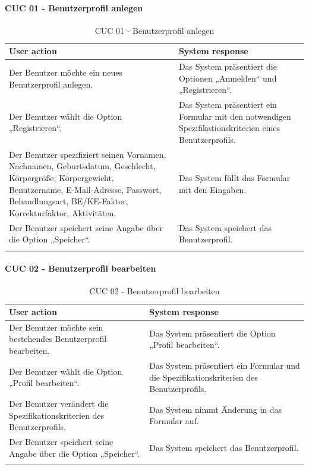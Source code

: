 \paragraph{CUC 01 - Benutzerprofil anlegen}
  \begin{center}
 	\begin{longtable}[H]{|p{6cm}|p{6cm}|}
 		\hline
 		\textbf{User action} & \textbf{System response}\\
 		\hline
 		Der Benutzer möchte ein neues Benutzerprofil anlegen.& Das System präsentiert die Optionen „Anmelden“ und „Registrieren“.\\
 		\hline
 		Der Benutzer wählt die Option „Registrieren“. &  Das System präsentiert ein Formular mit den notwendigen Spezifikationskriterien eines Benutzerprofils.\\
 		\hline
 		Der Benutzer spezifiziert seinen Vornamen, Nachnamen, Geburtsdatum, Geschlecht, Körpergröße, Körpergewicht, Benutzername, 
 		E-Mail-Adresse, Passwort, Behandlungsart, BE/KE-Faktor, Korrekturfaktor, Aktivitäten. & Das System 	füllt das Formular mit den Eingaben.\\
 		\hline
 		Der Benutzer speichert seine Angabe über die Option „Speicher“. & Das System speichert das Benutzerprofil.\\
 		\hline
 		\captionsetup{justification=centering}
 		\caption{CUC 01 - Benutzerprofil anlegen}
 		\label{tab:Persona Use Cases 1}
 	\end{longtable}
 \end{center}
\paragraph{CUC 02 - Benutzerprofil bearbeiten}
\begin{center}
	\begin{longtable}[H]{|p{6cm}|p{6cm}|}
		\hline
		\textbf{User action} & \textbf{System response}\\
		\hline
		Der Benutzer möchte sein bestehendes Benutzerprofil bearbeiten. & Das System präsentiert die Option „Profil bearbeiten“.\\
		\hline
		Der Benutzer wählt die Option „Profil bearbeiten“. &  Das System präsentiert ein Formular und die Spezifikationskriterien des Benutzerprofils.\\
		\hline
		Der Benutzer verändert die Spezifikationskriterien des Benutzerprofils. & Das System nimmt Änderung in das Formular auf.\\
		\hline
		Der Benutzer speichert seine Angabe über die Option „Speicher“. & Das System speichert das Benutzerprofil.\\
		\hline
		\captionsetup{justification=centering}
		\caption{CUC 02 - Benutzerprofil bearbeiten}
		\label{tab:Persona Use Cases 2}
	\end{longtable}
\end{center}
